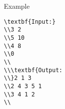 Example
\begin{verbatim}
\textbf{Input:}
\\3 2
\\5 10
\\4 8
\\0
\\
\\\textbf{Output:
\\}2 1 3
\\2 4 3 5 1
\\3 4 1 2
\\\end{verbatim}